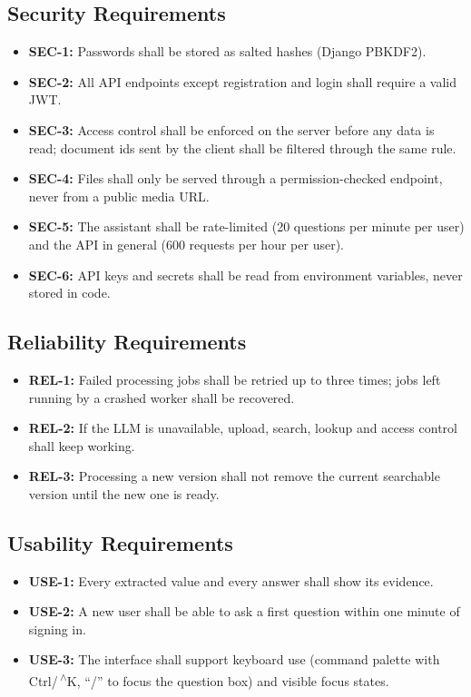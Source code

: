 \subsection{Security Requirements}
\begin{itemize}
\item \textbf{SEC-1:} Passwords shall be stored as salted hashes (Django PBKDF2).
\item \textbf{SEC-2:} All API endpoints except registration and login shall require a valid JWT.
\item \textbf{SEC-3:} Access control shall be enforced on the server before any data is read; document ids
sent by the client shall be filtered through the same rule.
\item \textbf{SEC-4:} Files shall only be served through a permission-checked endpoint, never from a public
media URL.
\item \textbf{SEC-5:} The assistant shall be rate-limited (20 questions per minute per user) and the API
in general (600 requests per hour per user).
\item \textbf{SEC-6:} API keys and secrets shall be read from environment variables, never stored in code.
\end{itemize}
\subsection{Reliability Requirements}
\begin{itemize}
\item \textbf{REL-1:} Failed processing jobs shall be retried up to three times; jobs left running by a
crashed worker shall be recovered.
\item \textbf{REL-2:} If the LLM is unavailable, upload, search, lookup and access control shall keep working.
\item \textbf{REL-3:} Processing a new version shall not remove the current searchable version until the new
one is ready.
\end{itemize}
\subsection{Usability Requirements}
\begin{itemize}
\item \textbf{USE-1:} Every extracted value and every answer shall show its evidence.
\item \textbf{USE-2:} A new user shall be able to ask a first question within one minute of signing in.
\item \textbf{USE-3:} The interface shall support keyboard use (command palette with Ctrl/\,\textsuperscript{$\wedge$}K, ``/'' to focus
the question box) and visible focus states.
\end{itemize}
